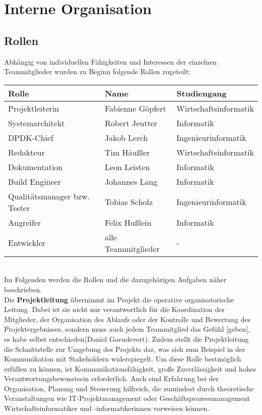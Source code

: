 \documentclass[../review_1.tex]{subfiles}
\begin{document}
\chapter{Interne Organisation}\thispagestyle{fancy}	\section{Rollen}
Abhängig von individuellen Fähigkeiten und Interessen der einzelnen Teammitglieder wurden zu Beginn folgende Rollen zugeteilt:
\begin{table} [h]
    \centering
    \begin{tabular} {lll}
        \textbf{Rolle}               & \textbf{Name}       & \textbf{Studiengang}  \\ \toprule
        Projektleiterin              & Fabienne Göpfert    & Wirtschaftsinformatik \\
        Systemarchitekt              & Robert Jeutter      & Informatik            \\
        DPDK-Chief                  & Jakob Lerch         & Ingenieurinformatik   \\
        Redakteur                    & Tim Häußler         & Wirtschaftsinformatik \\
        Dokumentation                & Leon Leisten        & Informatik            \\
        Build Engineer               & Johannes Lang       & Informatik            \\
        Qualitätsmanager bzw. Tester & Tobias Scholz       & Ingenieurinformatik   \\
        Angreifer                    & Felix Hußlein       & Informatik            \\
        Entwickler                   & alle Teammitglieder & -                     \\
    \end{tabular}
\end{table}
\\Im Folgenden werden die Rollen und die dazugehörigen Aufgaben näher beschrieben. \\
Die \textbf{Projektleitung} übernimmt im Projekt die operative organisatorische Leitung. Dabei ist sie nicht nur verantwortlich für die Koordination der Mitglieder, der Organisation des Ablaufs oder der Kontrolle und Bewertung des Projektergebnisses, sondern muss auch \glqq jedem Teammitglied das Gefühl [geben], es habe selbst entschieden\grqq (Daniel Goeudevert). Zudem stellt die Projektleitung die Schnittstelle zur Umgebung des Projekts dar, was sich zum Beispiel in der Kommunikation mit Stakeholdern widerspiegelt. Um diese Rolle bestmöglich erfüllen zu können, ist Kommunikationsfähigkeit, große Zuverlässigkeit und hohes Verantwortungsbewusstsein erforderlich. Auch sind Erfahrung bei der Organisation, Planung und Steuerung hilfreich, die zumindest durch theoretische Veranstaltungen wie \glqq IT-Projektmanagement\grqq{} oder \glqq Geschäftsprozessmanagement\grqq{} Wirtschaftsinformatiker und -informatikerinnen vorweisen können. \\
\end{document}
